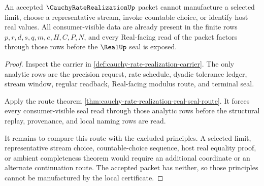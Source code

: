 \begin{theorem}
\label{thm:cauchy-rate-realization-no-choice-boundary}
An accepted $\CauchyRateRealizationUp$ packet cannot manufacture a selected limit, choose a representative stream, invoke countable choice, or identify host real values. All consumer-visible data are already present in the finite rows $p,r,d,s,q,m,e,H,C,P,N$, and every Real-facing read of the packet factors through those rows before the $\RealUp$ seal is exposed.
\end{theorem}
\begin{proof}
Inspect the carrier in \autoref{def:cauchy-rate-realization-carrier}. The only analytic rows are the precision request, rate schedule, dyadic tolerance ledger, stream window, regular readback, Real-facing modulus route, and terminal seal.

Apply the route theorem \autoref{thm:cauchy-rate-realization-real-seal-route}. It forces every consumer-visible seal read through those analytic rows before the structural replay, provenance, and local naming rows are read.

It remains to compare this route with the excluded principles. A selected limit, representative stream choice, countable-choice sequence, host real equality proof, or ambient completeness theorem would require an additional coordinate or an alternate continuation route. The accepted packet has neither, so those principles cannot be manufactured by the local certificate.
\end{proof}

